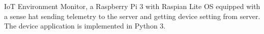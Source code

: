 IoT Environment Monitor, a Raspberry Pi 3 with Raspian Lite OS equipped with a sense hat sending telemetry to the server and getting device setting from server. The device application is implemented in Python 3. 